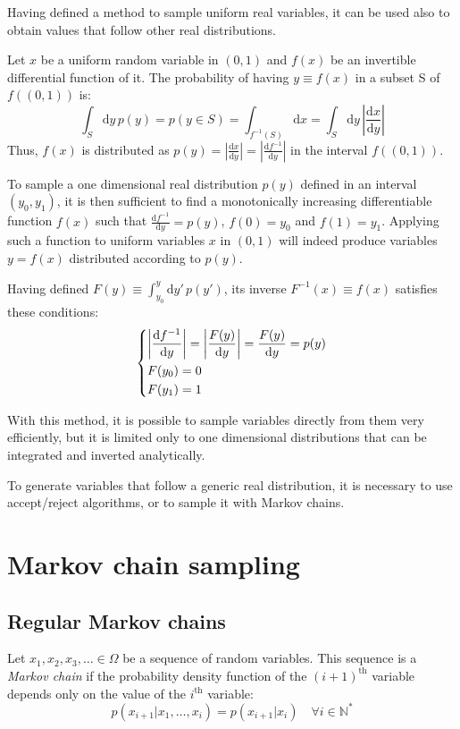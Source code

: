 Having defined a method to sample uniform real variables,
it can be used also to obtain values that follow other real distributions.

Let $x$ be a uniform random variable in $(0,1)$ and $f(x)$ be an invertible differential function of it.
The probability of having $y\equiv f(x)$ in a subset S of $f((0,1))$ is:
\[
    \int_S\mathrm dy\,p(y) = p(y\in S) = \int_{f^{-1}(S)}\mathrm dx = \int_S\mathrm dy\,\left|\frac{\mathrm dx}{\mathrm dy}\right|
\]
Thus, $f(x)$ is distributed as $p(y) = \left|\frac{\mathrm dx}{\mathrm dy}\right| = \left|\frac{\mathrm df^{-1}}{\mathrm dy}\right|$ in the interval $f((0,1))$.

To sample a one dimensional real distribution $p(y)$ defined in an interval $(y_0, y_1)$,
it is then sufficient to find a monotonically increasing differentiable function $f(x)$ such that $\frac{\mathrm df^{-1}}{\mathrm dy}=p(y)$, $f(0)=y_0$ and $f(1)=y_1$.
Applying such a function to uniform variables $x$ in $(0,1)$ will indeed produce variables $y=f(x)$ distributed according to $p(y)$.

Having defined $F(y) \equiv \int_{y_0}^y\mathrm dy'\,p(y')$, its inverse $F^{-1}(x) \equiv f(x)$ satisfies these conditions:
\[\begin{dcases}
    \left|\frac{\mathrm df^{-1}}{\mathrm dy}\right| = \left|\frac{F(y)}{\mathrm dy}\right| = \frac{F(y)}{\mathrm dy} = p(y) \\
    F(y_0) = 0 \\
    F(y_1) = 1
\end{dcases}\]

With this method, it is possible to sample variables directly from them very efficiently,
but it is limited only to one dimensional distributions that can be integrated and inverted analytically.

To generate variables that follow a generic real distribution, it is necessary to use accept/reject algorithms,
or to sample it with Markov chains.

\section{Markov chain sampling}

\subsection*{Regular Markov chains}
Let $x_1, x_2, x_3, \ldots \in \Omega$ be a sequence of random variables.
This sequence is a \emph{Markov chain} if the probability density function of the $(i+1)^\mathrm{th}$
variable depends only on the value of the $i^\mathrm{th}$ variable:
\[
    p(x_{i+1}|x_1, \ldots, x_i) = p(x_{i+1}|x_i) \quad \forall i\in\mathbb N^*
\]

